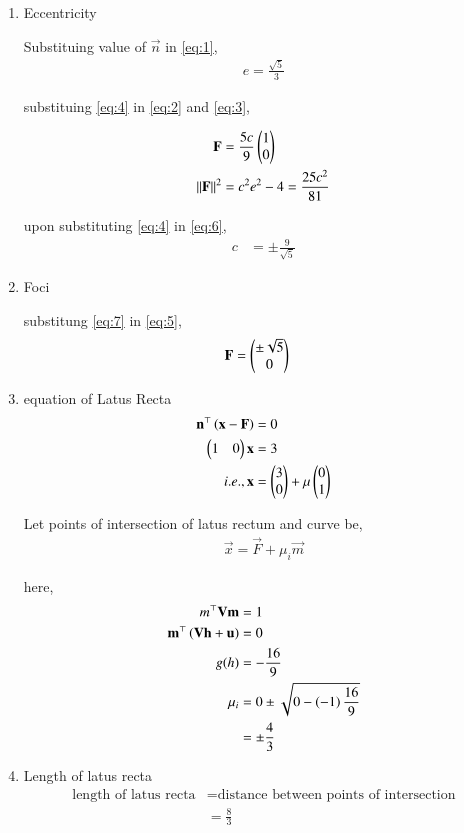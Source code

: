 \documentclass[journal,12pt,twocolumn]{IEEEtran}
\begin{document}
\begin{enumerate}
\item Eccentricity

Substituing value of $\vec{n}$ in \eqref{eq:1},
\begin{align}
	e = \frac{\sqrt{5}}{3} 	\label{eq:4}
\end{align}

substituing \eqref{eq:4} in \eqref{eq:2} and \eqref{eq:3},

\begin{align}
	\mathbf{F} &= \frac{5c}{9}\begin{pmatrix}1\\0\end{pmatrix} \label{eq:5} \\
	\left\lVert\mathbf{F}\right\rVert^2 &= c^2e^2 -4 = \frac{25c^2}{81}  \label{eq:6}
\end{align}

upon substituting \eqref{eq:4} in \eqref{eq:6},
\begin{align}
	c &= \pm \frac{9}{\sqrt{5}} \label{eq:7}
\end{align}

\item Foci

	substitung \eqref{eq:7} in \eqref{eq:5},
\begin{align}
	\mathbf{F} &= \begin{pmatrix} \pm \sqrt{5} \\0\end{pmatrix}
\end{align}

\item equation of Latus Recta
\begin{align}
	\mathbf{n}^{\top} \left(\mathbf{x} -\mathbf{F}\right) &= 0\\
	\begin{pmatrix} 1&0\end{pmatrix} \mathbf{x} &= 3\\
	i.e., \mathbf{x} &= \begin{pmatrix}3\\0\end{pmatrix} + \mu \begin{pmatrix}0\\1\end{pmatrix} 
\end{align}

Let points of intersection of latus rectum and curve be,
\begin{align}
	\vec{x} = \vec{F} + \mu_i \vec{m}
\end{align}


here,
\begin{align}
	m^{\top}\mathbf{V}\mathbf{m} &= 1\\
	\mathbf{m}^{\top}\left(\mathbf{V}\mathbf{h}+\mathbf{u}\right) &= 0 \\
	g(h) &= -\frac{16}{9}\\
	{\mu}_i &= {0 \pm \sqrt{0 - \left(-1\right)\frac{16}{9}}}\\
		&= \pm \frac{4}{3}
\end{align}

\item Length of latus recta
\begin{align}
\text{length of latus recta} &= \text{distance between points of intersection}\\
&= \frac{8}{3}
\end{align}

\end{enumerate}
\end{document}

